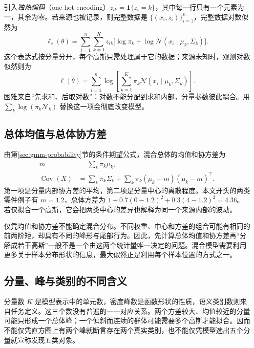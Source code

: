 \documentclass[UTF8,12pt,a4paper,fontset=fandol]{ctexart}
\begin{document}
引入\emph{独热编码}（one-hot encoding）$z_{ik}=\mathbf1\{z_i=k\}$，其中每一行只有一个元素为一，其余为零。若来源也被记录，则完整数据是 $\{(x_i,z_i)\}_{i=1}^n$，完整数据对数似然为
\begin{equation}
\ell_c(\theta)=\sum_{i=1}^n\sum_{k=1}^Kz_{ik}
\bigl[\log\pi_k+\log\mathcal N(x_i\mid\mu_k,\Sigma_k)\bigr].
\label{eq:gmm-complete-loglik}
\end{equation}
这个表达式按分量分开，每个高斯只需处理属于它的数据；来源未知时，观测对数似然则为
\begin{equation}
\ell(\theta)=\sum_{i=1}^n\log\!\left[\sum_{k=1}^K\pi_k\mathcal N(x_i\mid\mu_k,\Sigma_k)\right].
\label{eq:gmm-observed-loglik}
\end{equation}
困难来自“先求和、后取对数”：对数不能分配到求和内部，分量参数彼此耦合。用 $\sum_k\log(\pi_k\mathcal N_k)$ 替换这一项会彻底改变模型。

\subsection{总体均值与总体协方差}
由第\ref{sec:gmm-probability}节的条件期望公式，混合总体的均值和协方差为
\begin{align}
m&=\sum_k\pi_k\mu_k,\label{eq:gmm-mixture-mean}\\
\operatorname{Cov}(X)&=\sum_k\pi_k\Sigma_k
+\sum_k\pi_k(\mu_k-m)(\mu_k-m)^\top.\label{eq:gmm-mixture-cov}
\end{align}
第一项是分量内部协方差的平均，第二项是分量中心的离散程度。本文开头的两类零件例子有 $m=1.2$，总体方差为 $1+0.7(0-1.2)^2+0.3(4-1.2)^2=4.36$。若仅拟合一个高斯，它会把两类中心的差异也解释为同一个来源内部的波动。

仅凭均值和协方差不能确定混合分布。不同权重、中心和方差的组合可能有相同的前两阶矩，却具有不同的峰形与尾部行为。因此，先计算总体均值和协方差再“分解成若干高斯”一般不是一个由这两个统计量唯一决定的问题。混合模型需要利用更多关于样本分布形状的信息，最大似然正是利用每个样本位置的方式之一。

\subsection{分量、峰与类别的不同含义}
分量数 $K$ 是模型表示中的单元数，密度峰数是函数形状的性质，语义类别数则来自任务定义。这三个数没有普遍的一一对应关系。两个方差较大、均值较近的分量可能只形成一个总体峰；一个偏斜而连续的群体可能需要多个高斯才能拟合。因而不能仅凭直方图上有两个峰就断言存在两个真实类别，也不能仅凭模型选出五个分量就宣称发现五类对象。
\end{document}
